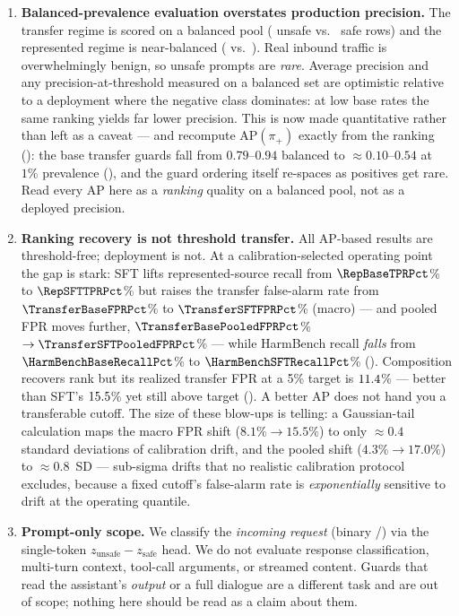 \begin{enumerate}[leftmargin=1.6em,itemsep=2pt]
  \item \textbf{Balanced-prevalence evaluation overstates production precision.} The transfer regime is scored on a balanced pool (\TransferPositiveN{} unsafe vs.\ \TransferNegativeN{} safe rows) and the represented regime is near-balanced (\RepPositiveN{} vs.\ \RepNegativeN{}). Real inbound traffic is overwhelmingly benign, so unsafe prompts are \emph{rare}. Average precision and any precision-at-threshold measured on a balanced set are optimistic relative to a deployment where the negative class dominates: at low base rates the same ranking yields far lower precision. This is now made quantitative rather than left as a caveat ---  and  recompute $\mathrm{AP}(\pi_+)$ exactly from the ranking (): the base transfer guards fall from $0.79$--$0.94$ balanced to $\approx0.10$--$0.54$ at $1\%$ prevalence (), and the guard ordering itself re-spaces as positives get rare. Read every AP here as a \emph{ranking} quality on a balanced pool, not as a deployed precision.

  \item \textbf{Ranking recovery is not threshold transfer.} All AP-based results are threshold-free; deployment is not. At a calibration-selected operating point the gap is stark: SFT lifts represented-source recall from $\RepBaseTPRPct$\% to $\RepSFTTPRPct$\% but raises the transfer false-alarm rate from $\TransferBaseFPRPct$\% to $\TransferSFTFPRPct$\% (macro) --- and pooled FPR moves further, $\TransferBasePooledFPRPct$\%$\to\TransferSFTPooledFPRPct$\% --- while HarmBench recall \emph{falls} from $\HarmBenchBaseRecallPct$\% to $\HarmBenchSFTRecallPct$\% (). Composition recovers rank but its realized transfer FPR at a 5\% target is $11.4$\% --- better than SFT's $15.5$\% yet still above target (). A better AP does not hand you a transferable cutoff. The size of these blow-ups is telling: a Gaussian-tail calculation maps the macro FPR shift ($8.1\%\!\to\!15.5\%$) to only $\approx0.4$ standard deviations of calibration drift, and the pooled shift ($4.3\%\!\to\!17.0\%$) to $\approx0.8$~SD --- sub-sigma drifts that no realistic calibration protocol excludes, because a fixed cutoff's false-alarm rate is \emph{exponentially} sensitive to drift at the operating quantile.

  \item \textbf{Prompt-only scope.} We classify the \emph{incoming request} (binary /) via the single-token $z_{\text{unsafe}}-z_{\text{safe}}$ head. We do not evaluate response classification, multi-turn context, tool-call arguments, or streamed content. Guards that read the assistant's \emph{output} or a full dialogue are a different task and are out of scope; nothing here should be read as a claim about them.
\end{enumerate}

